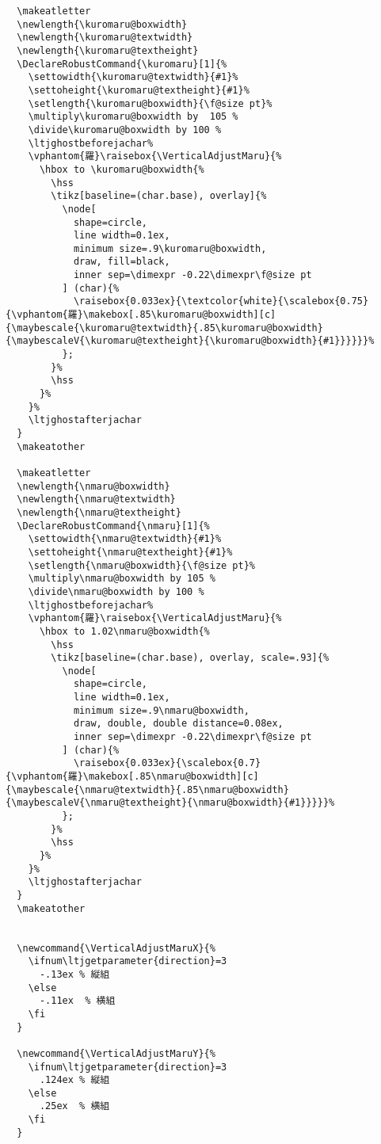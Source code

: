 \documentclass[luatex,fontsize=10pt,paper=b5,twoside]{jlreq}%
\begin{document}
\begin{lstlisting}
  \makeatletter
  \newlength{\kuromaru@boxwidth}
  \newlength{\kuromaru@textwidth}
  \newlength{\kuromaru@textheight}
  \DeclareRobustCommand{\kuromaru}[1]{%
    \settowidth{\kuromaru@textwidth}{#1}%
    \settoheight{\kuromaru@textheight}{#1}%
    \setlength{\kuromaru@boxwidth}{\f@size pt}%
    \multiply\kuromaru@boxwidth by  105 %
    \divide\kuromaru@boxwidth by 100 %
    \ltjghostbeforejachar%
    \vphantom{羅}\raisebox{\VerticalAdjustMaru}{%
      \hbox to \kuromaru@boxwidth{%
        \hss
        \tikz[baseline=(char.base), overlay]{%
          \node[
            shape=circle,
            line width=0.1ex,  
            minimum size=.9\kuromaru@boxwidth,  
            draw, fill=black,
            inner sep=\dimexpr -0.22\dimexpr\f@size pt    
          ] (char){%
            \raisebox{0.033ex}{\textcolor{white}{\scalebox{0.75}{\vphantom{羅}\makebox[.85\kuromaru@boxwidth][c]{\maybescale{\kuromaru@textwidth}{.85\kuromaru@boxwidth}{\maybescaleV{\kuromaru@textheight}{\kuromaru@boxwidth}{#1}}}}}}%
          };
        }%
        \hss
      }%
    }%
    \ltjghostafterjachar
  }
  \makeatother

  \makeatletter
  \newlength{\nmaru@boxwidth}
  \newlength{\nmaru@textwidth}
  \newlength{\nmaru@textheight}
  \DeclareRobustCommand{\nmaru}[1]{%
    \settowidth{\nmaru@textwidth}{#1}%
    \settoheight{\nmaru@textheight}{#1}%
    \setlength{\nmaru@boxwidth}{\f@size pt}%
    \multiply\nmaru@boxwidth by 105 %
    \divide\nmaru@boxwidth by 100 %
    \ltjghostbeforejachar%
    \vphantom{羅}\raisebox{\VerticalAdjustMaru}{%
      \hbox to 1.02\nmaru@boxwidth{%
        \hss
        \tikz[baseline=(char.base), overlay, scale=.93]{%
          \node[
            shape=circle,
            line width=0.1ex,  
            minimum size=.9\nmaru@boxwidth,  
            draw, double, double distance=0.08ex,
            inner sep=\dimexpr -0.22\dimexpr\f@size pt    
          ] (char){%
            \raisebox{0.033ex}{\scalebox{0.7}{\vphantom{羅}\makebox[.85\nmaru@boxwidth][c]{\maybescale{\nmaru@textwidth}{.85\nmaru@boxwidth}{\maybescaleV{\nmaru@textheight}{\nmaru@boxwidth}{#1}}}}}%
          };
        }%
        \hss
      }%
    }%
    \ltjghostafterjachar
  }
  \makeatother


  \newcommand{\VerticalAdjustMaruX}{%
    \ifnum\ltjgetparameter{direction}=3
      -.13ex % 縦組
    \else
      -.11ex  % 横組
    \fi
  }

  \newcommand{\VerticalAdjustMaruY}{%
    \ifnum\ltjgetparameter{direction}=3
      .124ex % 縦組
    \else
      .25ex  % 横組
    \fi
  }


\end{lstlisting}
\end{document}

